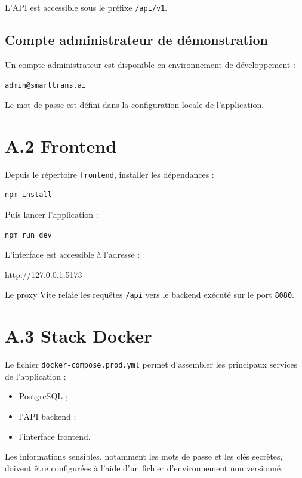 L'API est accessible sous le préfixe \texttt{/api/v1}.

\subsection*{Compte administrateur de démonstration}

Un compte administrateur est disponible en environnement de développement :

\texttt{admin@smarttrans.ai}

Le mot de passe est défini dans la configuration locale de l'application.

\section*{A.2 Frontend}

Depuis le répertoire \texttt{frontend}, installer les dépendances :

\begin{verbatim}
npm install
\end{verbatim}

Puis lancer l'application :

\begin{verbatim}
npm run dev
\end{verbatim}

L'interface est accessible à l'adresse :

\url{http://127.0.0.1:5173}

Le proxy Vite relaie les requêtes \texttt{/api} vers le backend exécuté sur le port \texttt{8080}.

\section*{A.3 Stack Docker}

Le fichier \texttt{docker-compose.prod.yml} permet d'assembler les principaux services de l'application :

\begin{itemize}
  \item PostgreSQL ;
  \item l'API backend ;
  \item l'interface frontend.
\end{itemize}

Les informations sensibles, notamment les mots de passe et les clés secrètes, doivent être configurées à l'aide d'un fichier d'environnement non versionné.
